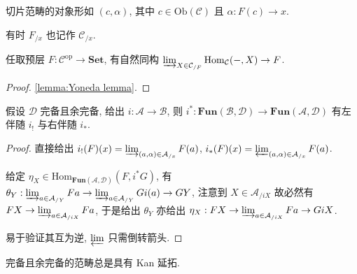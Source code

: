 \begin{remark}
    切片范畴的对象形如 \((c,\alpha)\), 其中 \(c \in \mathrm{Ob} (\mathcal{C})\) 且 \(\alpha : F(c) \to x\).
\end{remark}

\begin{remark}
    有时 \(F_{/x}\) 也记作 \(\mathcal{C}_{/x}\).
\end{remark}

\begin{lemma}
    任取预层 \(F : \mathcal{C}^\mathrm{op} \to \mathbf{Set}\), 有自然同构 \(\varinjlim_{X \in \mathcal{C}_{/ F}} \mathrm{Hom}_{\mathcal{C}} (-, X) \to F\).

    \begin{proof}
        \ref{lemma:Yoneda lemma}.
    \end{proof}
\end{lemma}

\begin{lemma}
    假设 \(\mathcal{D}\) 完备且余完备, 给出 \(i : \mathcal{A} \to \mathcal{B}\),
    则 \(i^\ast : \mathbf{Fun} (\mathcal{B},\mathcal{D}) \to \mathbf{Fun} (\mathcal{A},\mathcal{D})\) 有左伴随 \(i_!\) 与右伴随 \(i_\ast\).

    \begin{proof}
        直接给出 \(i_! (F) (x) = \varinjlim_{(a,\alpha) \in \mathcal{A}_{/x}} F(a)\), \(i_\ast (F) (x) = \varprojlim_{(a,\alpha) \in \mathcal{A}_{/x}} F(a)\).

        给定 \(\eta_X \in \mathrm{Hom}_{\mathbf{Fun} (\mathcal{A},\mathcal{D})} (F,i^\ast G)\), 有 \(\theta_Y : \varinjlim_{a \in \mathcal{A}_{/Y}} Fa \to \varinjlim_{a \in \mathcal{A}_{/Y}} Gi (a) \to GY\),
        注意到 \(X \in \mathcal{A}_{/iX}\) 故必然有 \(FX \to \varinjlim_{a \in \mathcal{A}_{/iX}} Fa\), 于是给出 \(\theta_Y\) 亦给出 \(\eta_X : FX \to \varinjlim_{a \in \mathcal{A}_{/iX}} Fa \to GiX\).

        易于验证其互为逆, \(\varprojlim\) 只需倒转箭头.
    \end{proof}
\end{lemma}

\begin{corollary}
    完备且余完备的范畴总是具有 Kan 延拓.
\end{corollary}

